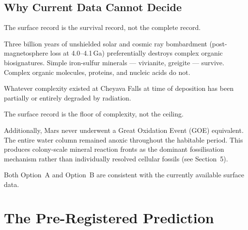 \documentclass[11pt, a4paper]{article}
\begin{document}
\subsection{Why Current Data Cannot Decide}

The surface record is the survival record,
not the complete record.

Three billion years of unshielded solar and
cosmic ray bombardment (post-magnetosphere loss
at 4.0--4.1\,Ga) preferentially destroys complex
organic biosignatures.
Simple iron-sulfur minerals --- vivianite,
greigite --- survive.
Complex organic molecules, proteins, and nucleic
acids do not.

Whatever complexity existed at Cheyava Falls
at time of deposition has been partially or
entirely degraded by radiation.

The surface record is the floor of complexity,
not the ceiling.

Additionally, Mars never underwent a
Great Oxidation Event (GOE) equivalent.
The entire water column remained anoxic
throughout the habitable period.
This produces colony-scale mineral reaction
fronts as the dominant fossilisation mechanism
rather than individually resolved cellular
fossils (see Section~5).

Both Option~A and Option~B are consistent
with the currently available surface data.

\section{The Pre-Registered Prediction}
\end{document}
